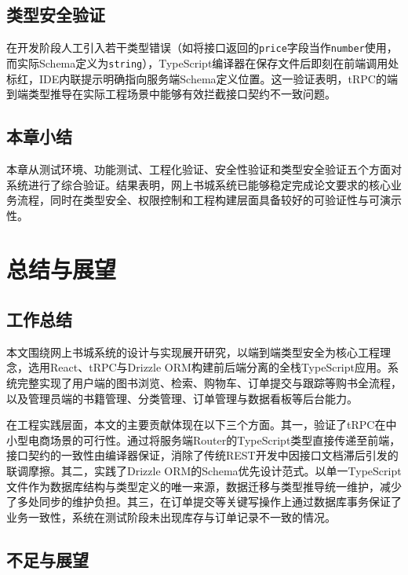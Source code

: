 \documentclass[12pt,a4paper]{ctexart}
\begin{document}
\subsection{类型安全验证}

在开发阶段人工引入若干类型错误（如将接口返回的\texttt{price}字段当作\texttt{number}使用，而实际Schema定义为\texttt{string}），TypeScript编译器在保存文件后即刻在前端调用处标红，IDE内联提示明确指向服务端Schema定义位置。这一验证表明，tRPC的端到端类型推导在实际工程场景中能够有效拦截接口契约不一致问题。

\subsection{本章小结}

本章从测试环境、功能测试、工程化验证、安全性验证和类型安全验证五个方面对系统进行了综合验证。结果表明，网上书城系统已能够稳定完成论文要求的核心业务流程，同时在类型安全、权限控制和工程构建层面具备较好的可验证性与可演示性。


\section{总结与展望}

\subsection{工作总结}

本文围绕网上书城系统的设计与实现展开研究，以端到端类型安全为核心工程理念，选用React、tRPC与Drizzle ORM构建前后端分离的全栈TypeScript应用。系统完整实现了用户端的图书浏览、检索、购物车、订单提交与跟踪等购书全流程，以及管理员端的书籍管理、分类管理、订单管理与数据看板等后台能力。

在工程实践层面，本文的主要贡献体现在以下三个方面。其一，验证了tRPC在中小型电商场景的可行性。通过将服务端Router的TypeScript类型直接传递至前端，接口契约的一致性由编译器保证，消除了传统REST开发中因接口文档滞后引发的联调摩擦。其二，实践了Drizzle ORM的Schema优先设计范式。以单一TypeScript文件作为数据库结构与类型定义的唯一来源，数据迁移与类型推导统一维护，减少了多处同步的维护负担。其三，在订单提交等关键写操作上通过数据库事务保证了业务一致性，系统在测试阶段未出现库存与订单记录不一致的情况。

\subsection{不足与展望}
\end{document}
